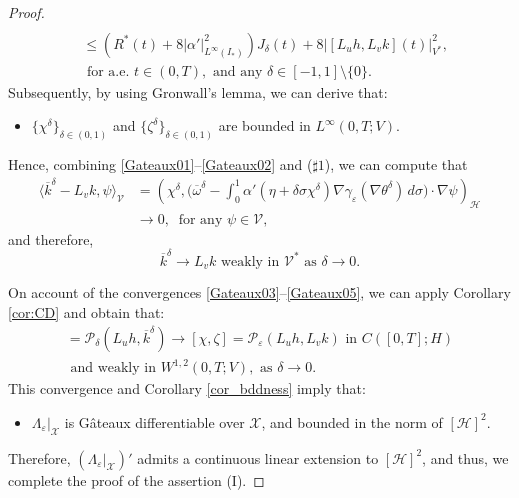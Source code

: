 \documentclass{sinst}
\numberwithin{equation}{section}
\theoremstyle{plain}
\theoremstyle{definition}
\def\sH{\mathscr{H}}
\def\sP{\mathscr{P}}
\def\sV{\mathscr{V}}
\def\sX{\mathscr{X}}
\begin{document}
\begin{proof}
\begin{align}
    \\
    &\leq (R^*(t) + 8|\alpha'|_{L^\infty(I_*)}^2) J_\delta(t) + 8|[L_u h, L_v k](t)|_{V^*}^2,
    \\
    &\mbox{ for a.e. } t \in (0,T), \mbox{ and any } \delta \in [-1,1] \setminus \{ 0 \}.
  \end{align}
  Subsequently, by using Gronwall's lemma, we can derive that:
  \begin{itemize}
    \item[($\sharp 0$)] $\{ \chi^\delta \}_{\delta \in (0,1)}$ and $\{ \zeta^\delta \}_{\delta \in (0,1)}$ are bounded in $L^\infty(0,T;V)$.
  \end{itemize}
  Hence, combining \eqref{Gateaux01}--\eqref{Gateaux02} and ($\sharp 1$), we can compute that
  \begin{align}
    \langle \overline{k}^\delta - L_v k, \psi \rangle_{\sV} &= \left( \chi^\delta, \biggl( \overline{\omega}^\delta - \int_0^1 \alpha'(\eta + \delta \sigma \chi^\delta) \nabla \gamma_\varepsilon(\nabla \theta^\delta) \,d\sigma \biggr) \cdot \nabla \psi \right)_\sH
    \\
    &\to 0, \ \mbox{ for any } \psi \in \sV,
  \end{align}
  and therefore,
  \begin{equation}
    \overline{k}^\delta \to L_v k \mbox{ weakly in } \sV^* \mbox{ as } \delta \to 0. \label{Gateaux05}
  \end{equation}
  
  On account of the convergences \eqref{Gateaux03}--\eqref{Gateaux05}, we can apply Corollary \ref{cor:CD} and obtain that:
  \begin{gather}
    [\chi^\delta, \zeta^\delta] = \sP_\delta(L_u h, \overline{k}^\delta) \to [\chi, \zeta] = \sP_\varepsilon(L_u h, L_v k) \mbox{ in } C([0,T];H)
    \\
    \mbox{ and weakly in } W^{1,2}(0,T;V), \mbox{ as } \delta \to 0. \label{Gateaux06}
  \end{gather}
  This convergence and Corollary \ref{cor_bddness} imply that:
  \begin{itemize}
    \item[($\sharp 1$)] $\Lambda_\varepsilon|_\sX$ is G\^{a}teaux differentiable over $\sX$, and bounded in the norm of $[\sH]^2$.
  \end{itemize}
  Therefore, $(\Lambda_\varepsilon|_\sX)'$ admits a continuous linear extension to $[\sH]^2$, and thus, we complete the proof of the assertion (I).


\end{proof}
\end{document}

